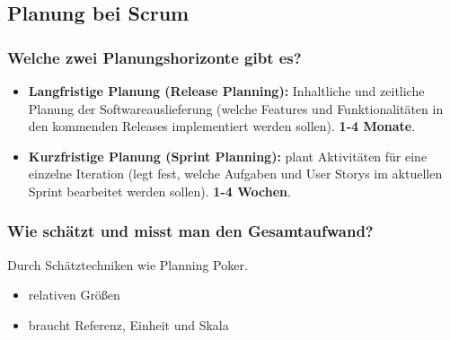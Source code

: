 \documentclass[main.tex]{subfiles}
\begin{document}
\subsection{Planung bei Scrum}
\subsubsection*{Welche zwei Planungshorizonte gibt es?} %
\begin{itemize}
    \item 
    \textbf{Langfristige Planung (Release Planning):} Inhaltliche und zeitliche Planung der Softwareauslieferung (welche Features und Funktionalitäten in den kommenden Releases implementiert werden sollen). \textbf{1-4 Monate}.  
    \item \textbf{Kurzfristige Planung (\gls{Sprint Planning}):} plant Aktivitäten für eine einzelne Iteration (legt fest, welche Aufgaben und \glspl{User Story} im aktuellen \gls{Sprint} bearbeitet werden sollen). \textbf{1-4 Wochen}.
\end{itemize}
\subsubsection*{Wie schätzt und misst man den Gesamtaufwand?} %
Durch Schätztechniken wie \gls{Planning Poker}.
\begin{itemize} 
    \item relativen Größen
    \item braucht Referenz, Einheit und Skala
\end{itemize}
\end{document}
